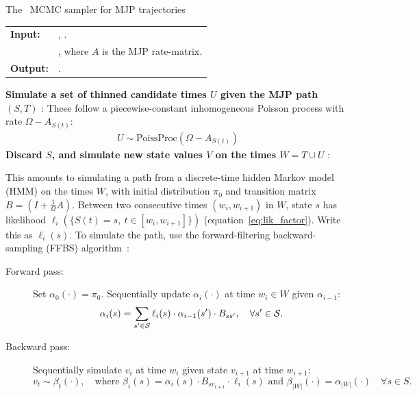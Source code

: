 \begin{algorithm}[H]
  \caption{The~\cite{RaoTeh13} MCMC sampler for MJP trajectories}
   \label{alg:Unif_gibbs}
  \begin{tabular}{l l}
   \textbf{Input:  } & \text{Prior $\pi_0$, observations $X$}, 
                       \text{the previous path $S(t) = (S, T)$}.\\ 
                     & \text{A  parameter $\Omega > \max_i A_i$}, where
   $A$ is the MJP rate-matrix.\\
   \textbf{Output:  }& \text{A new MJP trajectory $S' (t) = (S', T')$}.\\
   \hline
   \end{tabular}
   \begin{algorithmic}[1]
\State \textbf{ Simulate a set of thinned candidate times $U$ given the MJP path $(S,T)$ }: 
These follow a piecewise-constant inhomogeneous Poisson process with rate $\Omega-A_{S(t)}$: 
\begin{align*}
  U \sim \text{PoissProc}(\Omega - A_{S(t)}) 
\end{align*}
\State \textbf{
  Discard $S$, and simulate new state values $V$ on the %
  times $W = T \cup U$ 
}:

\noindent This amounts to simulating a path from a discrete-time hidden Markov model (HMM) on the times $W$, with initial distribution $\pi_0$ and transition matrix $B = \left(I+\frac{1}{\Omega}A\right)$.
Between two consecutive times $(w_i,w_{i+1})$ in $W$, state $s$ has 
likelihood $\ell_i(\{S(t) = s,\ t \in [w_i,w_{i+1}]\})$ (equation~\eqref{eq:lik_factor}). 
Write this as $\ell_i(s)$. 
To simulate the path, use the forward-filtering backward-sampling (FFBS) algorithm~\citep{fruhwirth1994data}: %
\begin{description}
  \item[Forward pass:] 
    Set $\alpha_0(\cdot) = \pi_0$.
    Sequentially update $\alpha_i(\cdot)$ at time $w_i \in W$ given $\alpha_{i-1}$: 
    $$\alpha_i(s) = \sum_{s' \in {\mathcal S}} \ell_i(s) \cdot \alpha_{i-1}(s')\cdot B_{ss'}, \quad \forall s' \in {\mathcal S}. $$
  \item[Backward pass:]
    Sequentially simulate $v_i$ at time $w_i$ given state $v_{i+1}$  at 
    time $w_{i+1}$:
    $$ v_t \sim \beta_t(\cdot),\quad \text{where } 
    \beta_i(s) = \alpha_i(s)\cdot B_{sv_{t+1}} \cdot \ell_i(s) \text{\ \ and \ } \beta_{|W|}(\cdot) = \alpha_{|W|}(\cdot) \quad \forall s \in S.$$
    

\end{description}
\end{algorithmic}
\end{algorithm}
